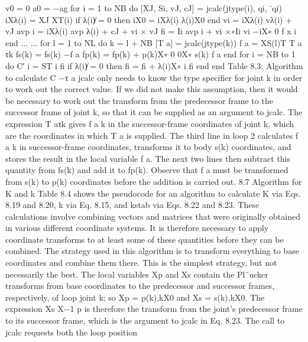 v0 = 0 a0 = −ag for i = 1 to NB do [XJ, Si, vJ, cJ] = jcalc(jtype(i), qi, ˙qi) iXλ(i) = XJ XT(i) if λ(i)̸ = 0 then iX0 = iXλ(i) λ(i)X0 end vi = iXλ(i) vλ(i) + vJ avp i = iXλ(i) avp λ(i) + cJ + vi × vJ fi = Ii avp i + vi ×∗Ii vi −iX∗ 0 f x i end ... ... for l = 1 to NL do k = l + NB [T a] = jcalc(jtype(k)) f a = XS(l)T T a τk fs(k) = fs(k) −f a fp(k) = fp(k) + p(k)X∗ 0 0X∗ s(k) f a end for i = NB to 1 do C′ i = ST i fi if λ(i)̸ = 0 then fi = fi + λ(i)X∗ i fi end end Table 8.3: Algorithm to calculate C −τ a jcalc only needs to know the type specifier for joint k in order to work out the correct value. If we did not make this assumption, then it would be necessary to work out the transform from the predecessor frame to the successor frame of joint k, so that it can be supplied as an argument to jcalc. The expression T aτk gives f a k in the successor-frame coordinates of joint k, which are the coordinates in which T a is supplied. The third line in loop 2 calculates f a k in successor-frame coordinates, transforms it to body s(k) coordinates, and stores the result in the local variable f a. The next two lines then subtract this quantity from fs(k) and add it to fp(k). Observe that f a must be transformed from s(k) to p(k) coordinates before the addition is carried out. 8.7 Algorithm for K and k Table 8.4 shows the pseudocode for an algorithm to calculate K via Eqs. 8.19 and 8.20, k via Eq. 8.15, and kstab via Eqs. 8.22 and 8.23. These calculations involve combining vectors and matrices that were originally obtained in various different coordinate systems. It is therefore necessary to apply coordinate transforms to at least some of these quantities before they can be combined. The strategy used in this algorithm is to transform everything to base coordinates and combine them there. This is the simplest strategy, but not necessarily the best. The local variables Xp and Xs contain the Pl¨ucker transforms from base coordinates to the predecessor and successor frames, respectively, of loop joint k; so Xp = p(k),kX0 and Xs = s(k),kX0. The expression Xs X−1 p is therefore the transform from the joint’s predecessor frame to its successor frame, which is the argument to jcalc in Eq. 8.23. The call to jcalc requests both the loop position

